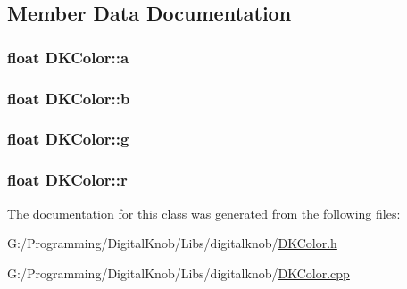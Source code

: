 \subsection{Member Data Documentation}
\hypertarget{class_d_k_color_acdc941c9a3aeefb4ef0d80bc382e7a9b}{
\subsubsection[{a}]{\setlength{\rightskip}{0pt plus 5cm}float D\-K\-Color\-::a}}\label{class_d_k_color_acdc941c9a3aeefb4ef0d80bc382e7a9b}
\hypertarget{class_d_k_color_a82c302604728867019f11109076ad1b0}{
\subsubsection[{b}]{\setlength{\rightskip}{0pt plus 5cm}float D\-K\-Color\-::b}}\label{class_d_k_color_a82c302604728867019f11109076ad1b0}
\hypertarget{class_d_k_color_af5bdbd995775a1095c7d402c278ce8e9}{
\subsubsection[{g}]{\setlength{\rightskip}{0pt plus 5cm}float D\-K\-Color\-::g}}\label{class_d_k_color_af5bdbd995775a1095c7d402c278ce8e9}
\hypertarget{class_d_k_color_a78081400c8580b6094c8b5b29190dfdf}{
\subsubsection[{r}]{\setlength{\rightskip}{0pt plus 5cm}float D\-K\-Color\-::r}}\label{class_d_k_color_a78081400c8580b6094c8b5b29190dfdf}


The documentation for this class was generated from the following files\-:\begin{DoxyCompactItemize}
\item 
G\-:/\-Programming/\-Digital\-Knob/\-Libs/digitalknob/\hyperlink{_d_k_color_8h}{D\-K\-Color.\-h}\item 
G\-:/\-Programming/\-Digital\-Knob/\-Libs/digitalknob/\hyperlink{_d_k_color_8cpp}{D\-K\-Color.\-cpp}\end{DoxyCompactItemize}
